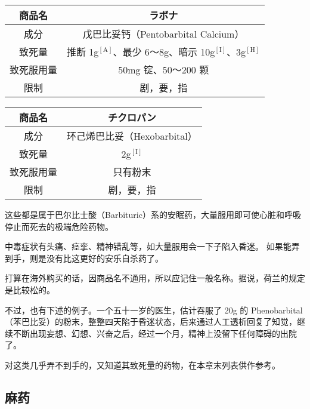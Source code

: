 \documentclass[UTF8]{ctexart}
\begin{document}
\begin{table}[htbp]
\begin{center}
\begin{tabular}{cc}

\toprule
商品名 & ラボナ
 \\
\midrule
成分 & 戊巴比妥钙（Pentobarbital Calcium） \\
致死量 & 推断 1g$^\mathrm{[A]}$、最少 6～8g、暗示 10g$^\mathrm{[I]}$、3g$^\mathrm{[H]}$ \\
致死服用量 & 50mg 锭、50～200 颗 \\
限制& 剧，要，指 \\
\bottomrule
\end{tabular}
\end{center}
\end{table}


\begin{table}[htbp]
\begin{center}
\begin{tabular}{cc}

\toprule
商品名 & チクロパン
 \\
\midrule
成分 & 环己烯巴比妥（Hexobarbital） \\
致死量 & 2g$^\mathrm{[I]}$ \\
致死服用量 & 只有粉末 \\
限制& 剧，要，指 \\
\bottomrule
\end{tabular}
\end{center}
\end{table}

这些都是属于巴尔比士酸（Barbituric）系的安眠药，大量服用即可使心脏和呼吸停止而死去的极端危险药物。

中毒症状有头痛、痉挛、精神错乱等，如大量服用会一下子陷入昏迷。 如果能弄到手，则是没有比这更好的安乐自杀药了。

打算在海外购买的话，因商品名不通用，所以应记住一般名称。据说，荷兰的规定是比较松的。

不过，也有下述的例子。一个五十一岁的医生，估计吞服了 20g 的 Phenobarbital（苯巴比妥）的粉末，整整四天陷于昏迷状态，后来通过人工透析回复了知觉，继续不断出现妄想、幻想、兴奋之后，经过一个月，精神上没留下任何障碍的出院了。

对这类几乎弄不到手的，又知道其致死量的药物，在本章末列表供作参考。

\subsection{麻药}
\end{document}
